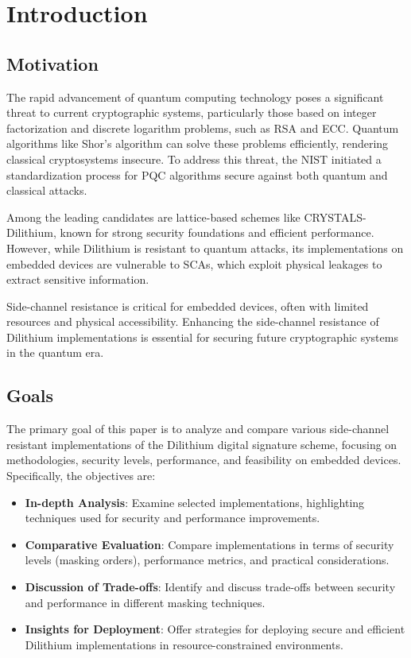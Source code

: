 
\chapter{Introduction}
\thispagestyle{chapterstart}

\section{Motivation}

The rapid advancement of quantum computing technology poses a significant threat to current cryptographic systems, particularly those based on integer factorization and discrete logarithm problems, such as RSA and \ac{ECC}. Quantum algorithms like Shor's algorithm can solve these problems efficiently, rendering classical cryptosystems insecure. To address this threat, the \ac{NIST} initiated a standardization process for \ac{PQC} algorithms secure against both quantum and classical attacks.

Among the leading candidates are lattice-based schemes like CRYSTALS-Dilithium, known for strong security foundations and efficient performance. However, while Dilithium is resistant to quantum attacks, its implementations on embedded devices are vulnerable to \acp{SCA}, which exploit physical leakages to extract sensitive information.

Side-channel resistance is critical for embedded devices, often with limited resources and physical accessibility. Enhancing the side-channel resistance of Dilithium implementations is essential for securing future cryptographic systems in the quantum era.

\section{Goals}

The primary goal of this paper is to analyze and compare various side-channel resistant implementations of the Dilithium digital signature scheme, focusing on methodologies, security levels, performance, and feasibility on embedded devices. Specifically, the objectives are:

\begin{itemize}
    \item \textbf{In-depth Analysis}: Examine selected implementations, highlighting techniques used for security and performance improvements.
    \item \textbf{Comparative Evaluation}: Compare implementations in terms of security levels (masking orders), performance metrics, and practical considerations.
    \item \textbf{Discussion of Trade-offs}: Identify and discuss trade-offs between security and performance in different masking techniques.
    \item \textbf{Insights for Deployment}: Offer strategies for deploying secure and efficient Dilithium implementations in resource-constrained environments.
\end{itemize}

